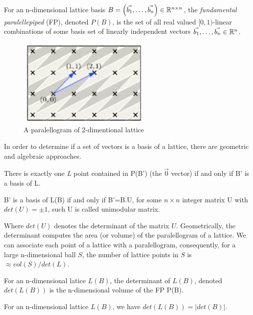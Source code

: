\begin{definition}
  For an n-dimensional lattice basis
  $B = \left( \vec{b_1}, \dots, \vec{b_n} \right) \in \mathbb{R}^{n \times n}$, the
  \emph{fundamental paralellepiped} (FP), denoted $P(B)$, is the set of all real
  valued $[0,1)$-linear combinations of some basis set of linearly independent
  vectors $\vec{b_1}, \dots ,\vec{b_n} \in \mathbb{R}^n$.
  \begin{figure}[h]
    \centering \includegraphics[scale=0.7]{parallelopiped}
    \caption{A paralellogram of 2-dimentional lattice}
    \label{fig:paralellopiped}
  \end{figure}
\end{definition}
In order to determine if a set of vectors is a basis of a lattice, there are
geometric and algebraic approaches.
\begin{lemma}
  There is exactly one \emph{L} point contained in P(B') (the $\vec{0}$ vector)
  if and only if B' is a basis of L.
  \label{lem:parallelopiped}
\end{lemma}
\begin{lemma}
  B' is a basis of L(B) if and only if B'=B.U, for some $n \times n$ integer
  matrix U with $det(U) = \pm 1$, such U is called unimodular matrix.
  \label{lem:detBasis}
\end{lemma}
Where $det(U)$ denotes the determinant of the matrix $U$.  Geometrically, the
determinant computes the area (or volume) of the paralellogram of a lattice. We
can associate each point of a lattice with a paralellogram, consequently, for a
large n-dimensional ball $S$, the number of lattice points in $S$ is
$\approx vol(S) / det(L)$.
\begin{definition}[Determinant]
  \label{def:determinant}
  For an n-dimensional latice $L(B)$, the determinant of $L(B)$, denoted
  $det(L(B))$ is the n-dimensional volume of the FP P(B).
\end{definition}
\begin{lemma}
  For an n-dimensional lattice $L(B)$, we have $det(L(B)) = |det(B)|$.
  \label{lem:determinant2}
\end{lemma}
